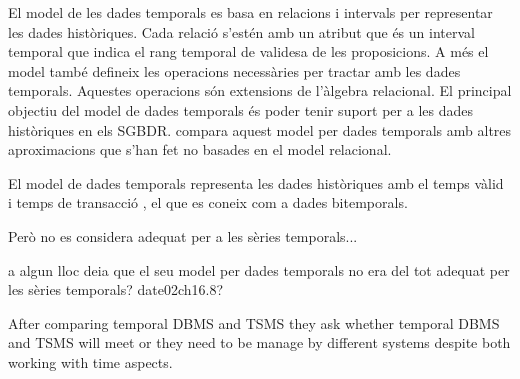 El model de les dades
temporals \parencite{date02:_tempor_data_relat_model} es basa en
relacions i intervals per representar les dades històriques. Cada
relació s'estén amb un atribut que és un interval temporal que indica
el rang temporal de validesa de les proposicions. A més el model també
defineix les operacions necessàries per tractar amb les dades
temporals. Aquestes operacions són extensions de l'àlgebra relacional.
El principal objectiu del model de dades temporals és poder tenir
suport per a les dades històriques en els SGBDR.
\textcite[cap.~28]{date06} compara aquest model per dades temporals
amb altres aproximacions que s'han fet no basades en el model
relacional.



El model de dades temporals representa les dades històriques amb el
temps vàlid i temps de
transacció \parencite[cap.~15]{date02:_tempor_data_relat_model}, el
que es coneix com a dades bitemporals.

Però no es considera adequat per a les sèries temporals...

a algun lloc deia que el seu model per dades temporals no era del tot adequat per les sèries temporals? date02ch16.8?




After comparing temporal DBMS and TSMS \parencite{schmidt95} they ask whether temporal DBMS and TSMS will meet or they need to be manage by different systems despite both working with time aspects.

















